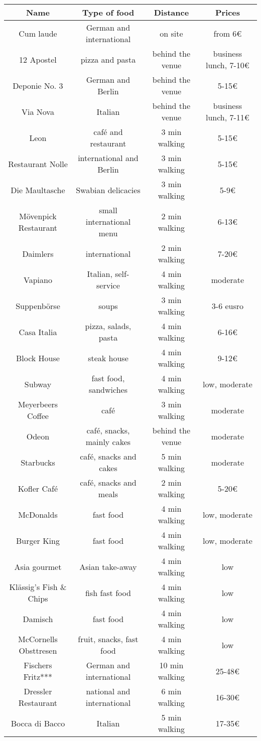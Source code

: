 \begin{tabular}{|c|c|c|c|}
  Name & Type of food & Distance & Prices \\ \hline
  Cum laude & German and international & on site & from 6€ \\
  12 Apostel & pizza and pasta & behind the venue & business lunch, 7-10€ \\
  Deponie No. 3 & German and Berlin & behind the venue & 5-15€ \\
  Via Nova & Italian & behind the venue & business lunch, 7-11€ \\
  Leon & caf\'{e} and restaurant & 3 min walking & 5-15€ \\
  Restaurant Nolle & international and Berlin & 3 min walking & 5-15€ \\
  Die Maultasche & Swabian delicacies & 3 min walking & 5-9€ \\
  M\"{o}venpick Restaurant & small international menu & 2 min walking & 6-13€ \\
  Daimlers & international & 2 min walking & 7-20€ \\
  Vapiano & Italian, self-service & 4 min walking& moderate \\
  Suppenb\"{o}rse & soups & 3 min walking & 3-6 eusro \\
  Casa Italia & pizza, salads, pasta & 4 min walking & 6-16€ \\
  Block House & steak house & 4 min walking & 9-12€ \\
  Subway & fast food, sandwiches & 4 min walking & low, moderate \\
  Meyerbeers Coffee & caf\'{e} & 3 min walking & moderate \\
  Odeon & caf\'{e}, snacks, mainly cakes & behind the venue & moderate \\
  Starbucks & caf\'{e}, snacks and cakes & 5 min walking & moderate \\
  Kofler Caf\'{e} & caf\'{e}, snacks and meals & 2 min walking & 5-20€ \\
  McDonalds & fast food & 4 min walking & low, moderate \\
  Burger King & fast food & 4 min walking & low, moderate \\
  Asia gourmet & Asian take-away & 4 min walking & low \\
  Kl\"{a}ssig's Fish \& Chips & fish fast food & 4 min walking & low \\
  Damisch & fast food & 4 min walking & low \\
  McCornells Obsttresen & fruit, snacks, fast food & 4 min walking & low \\
  Fischers Fritz*** & German and international & 10 min walking & 25-48€ \\
  Dressler Restaurant & national and international & 6 min walking &  16-30€ \\
  Bocca di Bacco & Italian & 5 min walking & 17-35€ \\
\end{tabular}

